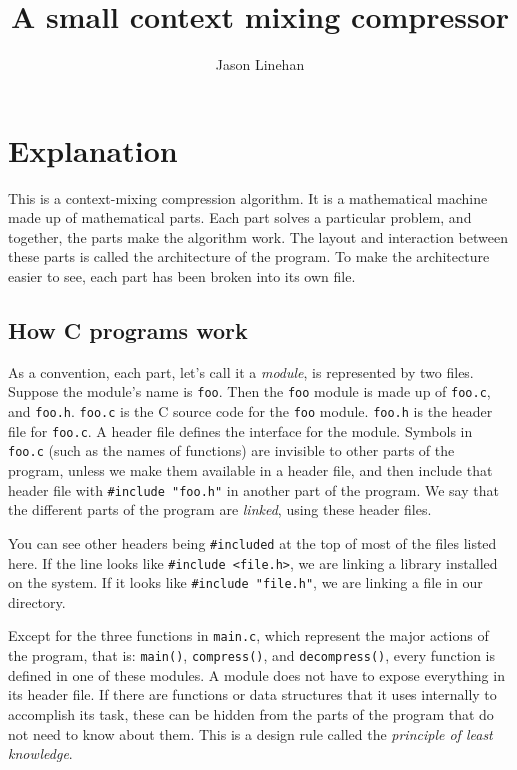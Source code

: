 \documentclass[10pt, fleqn]{article}
\date{}
\title{A small context mixing compressor}
\author{Jason Linehan}
\theoremstyle{break}
\newcommand{\0}    {\mathbf{0}}
\numberwithin{equation}{section}
\begin{document}
\maketitle



\section{Explanation}

This is a context-mixing compression algorithm. It is a mathematical machine
made up of mathematical parts. Each part solves a particular problem,
and together, the parts make the algorithm work. The layout and interaction
between these parts is called the architecture of the program. To make 
the architecture easier to see, each part has been broken into its own file.

\subsection{How C programs work}
As a convention, each part, let's call it a {\em module}, is represented by two 
files. Suppose the module's name is {\tt foo}. Then the {\tt foo} module is 
made up of {\tt foo.c}, and {\tt foo.h}. {\tt foo.c} is the C source code 
for the {\tt foo} module. {\tt foo.h} is the header file for {\tt foo.c}.
A header file defines the interface for the module. Symbols in {\tt foo.c} 
(such as the names of functions) are invisible to other parts of the program,
unless we make them available in a header file, and then include that header
file with {\tt \#include "foo.h"} in another part of the program. We say that
the different parts of the program are {\em linked}, using these header files.

You can see other headers being {\tt \#included} at the top of most of 
the files listed here. If the line looks like {\tt \#include <file.h>}, we
are linking a library installed on the system. If it looks like 
{\tt \#include "file.h"}, we are linking a file in our directory.

Except for the three functions in {\tt main.c}, which represent the major
actions of the program, that is: {\tt main()}, {\tt compress()}, and 
{\tt decompress()}, every function is defined in one of these modules.
A module does not have to expose everything in its header file. If there are 
functions or data structures that it uses internally to accomplish its task, 
these can be hidden from the parts of the program that do not need to know 
about them. This is a design rule called the {\em principle of least knowledge}.
\end{document}
